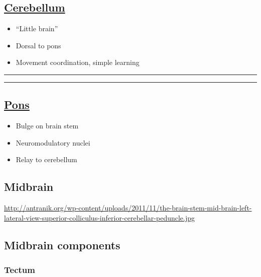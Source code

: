\documentclass[]{article}
\providecommand{\tightlist}{%
  \setlength{\itemsep}{0pt}\setlength{\parskip}{0pt}}
\begin{document}
\subsection{\texorpdfstring{\href{https://en.wikipedia.org/wiki/Cerebellum}{Cerebellum}}{Cerebellum}}\label{cerebellum}

\begin{itemize}
\tightlist
\item
  ``Little brain''
\item
  Dorsal to pons
\item
  Movement coordination, simple learning
\end{itemize}

\begin{center}\rule{0.5\linewidth}{\linethickness}\end{center}

\begin{center}\rule{0.5\linewidth}{\linethickness}\end{center}

\subsection{\texorpdfstring{\href{https://en.wikipedia.org/wiki/Pons}{Pons}}{Pons}}\label{pons}

\begin{itemize}
\tightlist
\item
  Bulge on brain stem
\item
  Neuromodulatory nuclei
\item
  Relay to cerebellum
\end{itemize}

\subsection{Midbrain}\label{midbrain}

\url{http://antranik.org/wp-content/uploads/2011/11/the-brain-stem-mid-brain-left-lateral-view-superior-colliculus-inferior-cerebellar-peduncle.jpg}

\subsection{Midbrain components}\label{midbrain-components}

\subsubsection{Tectum}\label{tectum}
\end{document}
